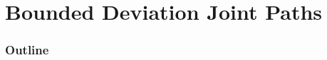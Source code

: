 \documentclass[10pt, aspectratio=169]{beamer}
\theoremstyle{remark}
\theoremstyle{definition}
\begin{document}
\section{Bounded Deviation Joint Paths}
\begin{frame}
	\frametitle{Outline} %
	\tableofcontents[currentsection] %
\end{frame}
\end{document}
